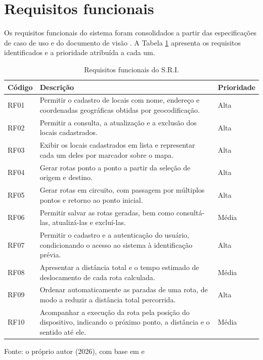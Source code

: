 \section{Requisitos funcionais}

Os requisitos funcionais do sistema foram consolidados a partir das especificações de caso de uso e do documento de visão \cite{sriEspecUC2026, sriVisao2025}. A Tabela \ref{tab:requisitos-funcionais} apresenta os requisitos identificados e a prioridade atribuída a cada um.

\begin{table}[!ht]
    \centering
    \caption{Requisitos funcionais do S.R.I.}
    \label{tab:requisitos-funcionais}
    \begin{tabular}{p{2cm} p{9cm} p{4cm}}
        \hline
        \textbf{Código} & \textbf{Descrição} & \textbf{Prioridade} \\
        \hline
        RF01 & Permitir o cadastro de locais com nome, endereço e coordenadas geográficas obtidas por geocodificação. & Alta \\
        \hline
        RF02 & Permitir a consulta, a atualização e a exclusão dos locais cadastrados. & Alta \\
        \hline
        RF03 & Exibir os locais cadastrados em lista e representar cada um deles por marcador sobre o mapa. & Alta \\
        \hline
        RF04 & Gerar rotas ponto a ponto a partir da seleção de origem e destino. & Alta \\
        \hline
        RF05 & Gerar rotas em circuito, com passagem por múltiplos pontos e retorno ao ponto inicial. & Alta \\
        \hline
        RF06 & Permitir salvar as rotas geradas, bem como consultá-las, atualizá-las e excluí-las. & Média \\
        \hline
        RF07 & Permitir o cadastro e a autenticação do usuário, condicionando o acesso ao sistema à identificação prévia. & Alta \\
        \hline
        RF08 & Apresentar a distância total e o tempo estimado de deslocamento de cada rota calculada. & Média \\
        \hline
        RF09 & Ordenar automaticamente as paradas de uma rota, de modo a reduzir a distância total percorrida. & Alta \\
        \hline
        RF10 & Acompanhar a execução da rota pela posição do dispositivo, indicando o próximo ponto, a distância e o sentido até ele. & Média \\
        \hline
    \end{tabular}
    \vspace{2pt}
    \footnotesize Fonte: o próprio autor (2026), com base em  e 
\end{table}


